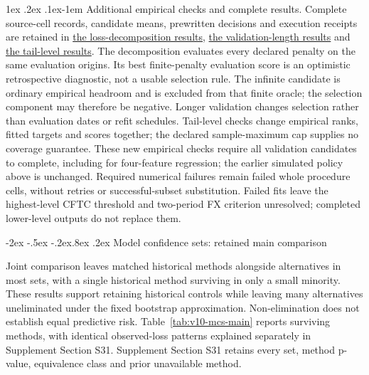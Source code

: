 \documentclass[10pt,a4paper]{article}
\makeatletter
\renewcommand\section{\@startsection{section}{1}{\z@}%
  {-2ex \@plus -.5ex \@minus -.2ex}{.8ex \@plus .2ex}%
  {\normalfont\large\bfseries}}
\renewcommand\paragraph{\@startsection{paragraph}{4}{\z@}%
  {1ex \@plus .2ex \@minus .1ex}{-1em}%
  {\normalfont\normalsize\bfseries}}
\makeatother
\begin{document}
\paragraph{Additional empirical checks and complete results.}
Complete source-cell records, candidate means, prewritten decisions and execution receipts are retained in \href{https://github.com/ByronLi0207/financial-mathematics-paper-20261020/tree/revision-v12/results/v12/decomposition}{the loss-decomposition results}, \href{https://github.com/ByronLi0207/financial-mathematics-paper-20261020/tree/revision-v12/results/v12/validation-length}{the validation-length results} and \href{https://github.com/ByronLi0207/financial-mathematics-paper-20261020/tree/revision-v12/results/v12/tau}{the tail-level results}. The decomposition evaluates every declared penalty on the same evaluation origins. Its best finite-penalty evaluation score is an optimistic retrospective diagnostic, not a usable selection rule. The infinite candidate is ordinary empirical headroom and is excluded from that finite oracle; the selection component may therefore be negative. Longer validation changes selection rather than evaluation dates or refit schedules. Tail-level checks change empirical ranks, fitted targets and scores together; the declared sample-maximum cap supplies no coverage guarantee. These new empirical checks require all validation candidates to complete, including for four-feature regression; the earlier simulated policy above is unchanged. Required numerical failures remain failed whole procedure cells, without retries or successful-subset substitution. Failed fits leave the highest-level CFTC threshold and two-period FX criterion unresolved; completed lower-level outputs do not replace them.

\section{Model confidence sets: retained main comparison}\label{sup:v13-mcs}

Joint comparison leaves matched historical methods alongside alternatives in most sets, with a single historical method surviving in only a small minority. These results support retaining historical controls while leaving many alternatives uneliminated under the fixed bootstrap approximation. Non-elimination does not establish equal predictive risk. Table~\ref{tab:v10-mcs-main} reports surviving methods, with identical observed-loss patterns explained separately in Supplement Section S31. Supplement Section S31 retains every set, method p-value, equivalence class and prior unavailable method.
\end{document}
